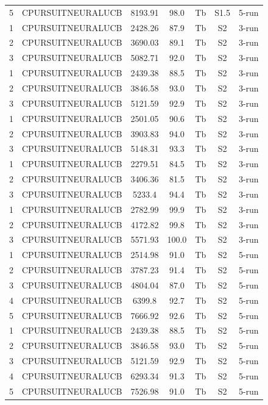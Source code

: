 \documentclass[11pt]{article}
\begin{document}
\begin{center}
\begin{longtable}{|c|c|c|c|c|c|c|}
5 & CPURSUITNEURALUCB & 8193.91 & 98.0 & Tb & S1.5 & 5-run \\
1 & CPURSUITNEURALUCB & 2428.26 & 87.9 & Tb & S2 & 3-run \\
2 & CPURSUITNEURALUCB & 3690.03 & 89.1 & Tb & S2 & 3-run \\
3 & CPURSUITNEURALUCB & 5082.71 & 92.0 & Tb & S2 & 3-run \\
1 & CPURSUITNEURALUCB & 2439.38 & 88.5 & Tb & S2 & 3-run \\
2 & CPURSUITNEURALUCB & 3846.58 & 93.0 & Tb & S2 & 3-run \\
3 & CPURSUITNEURALUCB & 5121.59 & 92.9 & Tb & S2 & 3-run \\
1 & CPURSUITNEURALUCB & 2501.05 & 90.6 & Tb & S2 & 3-run \\
2 & CPURSUITNEURALUCB & 3903.83 & 94.0 & Tb & S2 & 3-run \\
3 & CPURSUITNEURALUCB & 5148.31 & 93.3 & Tb & S2 & 3-run \\
1 & CPURSUITNEURALUCB & 2279.51 & 84.5 & Tb & S2 & 3-run \\
2 & CPURSUITNEURALUCB & 3406.36 & 81.5 & Tb & S2 & 3-run \\
3 & CPURSUITNEURALUCB & 5233.4 & 94.4 & Tb & S2 & 3-run \\
1 & CPURSUITNEURALUCB & 2782.99 & 99.9 & Tb & S2 & 3-run \\
2 & CPURSUITNEURALUCB & 4172.82 & 99.8 & Tb & S2 & 3-run \\
3 & CPURSUITNEURALUCB & 5571.93 & 100.0 & Tb & S2 & 3-run \\
1 & CPURSUITNEURALUCB & 2514.98 & 91.0 & Tb & S2 & 5-run \\
2 & CPURSUITNEURALUCB & 3787.23 & 91.4 & Tb & S2 & 5-run \\
3 & CPURSUITNEURALUCB & 4804.04 & 87.0 & Tb & S2 & 5-run \\
4 & CPURSUITNEURALUCB & 6399.8 & 92.7 & Tb & S2 & 5-run \\
5 & CPURSUITNEURALUCB & 7666.92 & 92.6 & Tb & S2 & 5-run \\
1 & CPURSUITNEURALUCB & 2439.38 & 88.5 & Tb & S2 & 5-run \\
2 & CPURSUITNEURALUCB & 3846.58 & 93.0 & Tb & S2 & 5-run \\
3 & CPURSUITNEURALUCB & 5121.59 & 92.9 & Tb & S2 & 5-run \\
4 & CPURSUITNEURALUCB & 6293.34 & 91.3 & Tb & S2 & 5-run \\
5 & CPURSUITNEURALUCB & 7526.98 & 91.0 & Tb & S2 & 5-run \\

\end{longtable}
\end{center}
\end{document}
